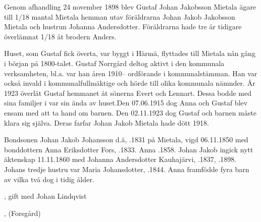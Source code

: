 Genom afhandling 24 november 1898 blev Gustaf Johan Jakobsson Mietala ägare till 1/18 mantal Mietala hemman utav föräldrarna Johan Jakob Jakobsson Mietala och hustrun Johanna Andersdotter. Föräldrarna hade tre år tidigare överlämnat 1/18 åt brodern Anders.

Huset, som Gustaf fick överta, var byggt i Härmä, flyttades till Mietala nån gång i början på 1800-talet. Gustaf Norrgård deltog aktivt i den kommunala verksamheten, bl.a. var han åren 1910-- ordförande i kommunalstämman. Han var också invald i kommunalfullmäktige och hörde till olika kommunala nämnder. År 1923 överlät Gustaf hemmanet åt sönerna Evert och Lennart. Dessa bodde med sina familjer i var sin ända av huset.Den 07.06.1915 dog Anna och Gustaf blev ensam med att ta hand om barnen. Den 02.11.1923 dog Gustaf och barnen måste klara sig själva. Deras farfar Johan Jakob Mietala hade dött 1918.


Bondsonen Johan Jakob Johansson d.ä, .1831 på Mietala, vigd 06.11.1850 med bonddottern Anna Eriksdotter Fors, .1833. Anna .1858. Johan Jakob ingick nytt äktenskap 11.11.1860 med Johanna Andersdotter Kauhajärvi, .1837, .1898. Johans tredje hustru var Maria Johansdotter,  .1844.
Anna framfödde fyra barn av vilka två dog i tidig ålder.
\begin{jhchildren}
  \item {}, gift med Johan Lindqvist
  \item {}, (Forsgård)
  \item {}
  \item {}
\end{jhchildren}

